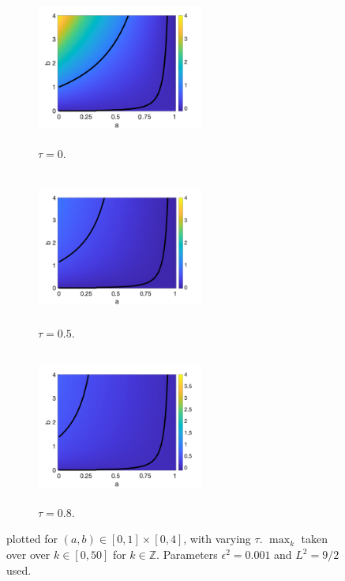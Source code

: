 \begin{figure}[H]
    \centering
    \begin{subfigure}[t]{0.32\textwidth}
        \centering
        \includegraphics[width=5.5cm,height = 5cm]{f1t0.png}
        \caption{$\tau=0$.}
        \label{}
    \end{subfigure}
    \hfill
    \begin{subfigure}[t]{0.32\textwidth}
        \centering
        \includegraphics[width=5.5cm,height = 5cm]{f2t05.png}
        \caption{$\tau=0.5$.}
        \label{}
    \end{subfigure}
    \hfill
    \begin{subfigure}[t]{0.32\textwidth}
        \centering
        \includegraphics[width=5.5cm,height = 5cm]{f2t08.png}
        \caption{$\tau=0.8$.}
        \label{}
    \end{subfigure}
    \caption{ plotted for $(a,b)\in[0,1]\times[0,4]$, with varying $\tau$. $\max_k$ taken over over $k\in[0,50]$ for $k\in\mathbb{Z}$. Parameters $\epsilon^2=0.001$ and $L^2=9/2$ used.}
    \label{fig:fad2}
\end{figure}
